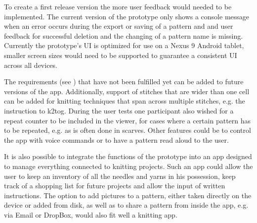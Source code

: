 To create a first release version the more user feedback would needed to be implemented. The current version of the prototype only shows a console message when an error occurs during the export or saving of a pattern and and user feedback for successful deletion and the changing of a pattern name is missing. Currently the prototype's \gls{UI} is optimized for use on a Nexus 9 Android tablet, smaller screen sizes would need to be supported to guarantee a consistent \gls{UI} across all devices. 

The requirements (see ) that have not been fulfilled yet can be added to future versions of the app. Additionally, support of stitches that are wider than one cell can be added for knitting techniques that span across multiple stitches, e.g. the instruction to \gls{k2tog}. During the user tests one participant also wished for a repeat counter to be included in the viewer, for cases where a certain pattern has to be repeated, e.g. as is often done in scarves. Other features could be to control the app with voice commands or to have a pattern read aloud to the user.  

It is also possible to integrate the functions of the prototype into an app designed to manage everything connected to knitting projects. Such an app could allow the user to keep an inventory of all the needles and yarns in his possession, keep track of a shopping list for future projects and allow the input of written instructions. The option to add pictures to a pattern, either taken directly on the device or added from disk, as well as to share a pattern from inside the app, e.g. via Email or DropBox, would also fit well a knitting app. 
